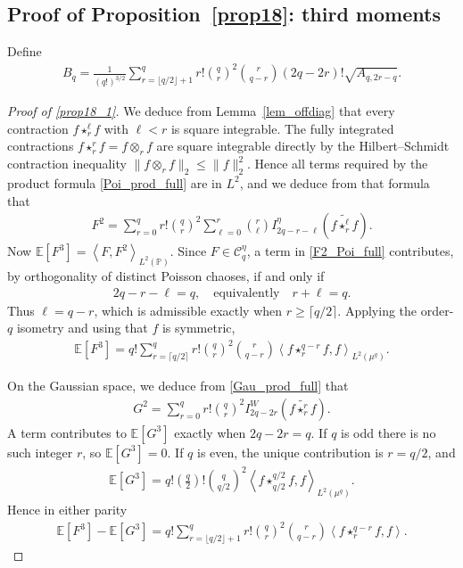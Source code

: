 \documentclass[letterpaper,11pt,reqno]{amsart}
\numberwithin{equation}{section}
\theoremstyle{plain}
\theoremstyle{definition}
\theoremstyle{remark}
\newcommand{\E}{\mathbb{E}}
\newcommand{\PP}{\mathbb{P}}
\newcommand{\cC}{\mathcal{C}}
\newcommand{\noi}{\noindent}
\newcommand{\wt}{\widetilde}
\newcommand{\inner}[2]{\left\langle #1,#2\right\rangle}
\begin{document}
\subsection{Proof of Proposition~\ref{prop18}: third moments}
\label{SEC_53}
Define
\noi
\begin{align}
 B_q
 =\frac1{(q!)^{3/2}}
 \sum_{r=\lfloor q/2\rfloor+1}^{q}
 r!\binom qr^2\binom r{q-r}
 (2q-2r)!
 \sqrt{A_{q,2r-q}}.
 \label{Bq_def}
\end{align}

\begin{proof}[Proof of \eqref{prop18_1}]
We deduce from Lemma~\ref{lem_offdiag} that every contraction
$f\star_r^\ell f$ with $\ell<r$ is square integrable.  The fully
integrated contractions $f\star_r^r f=f\otimes_r f$ are square
integrable directly by the Hilbert--Schmidt contraction inequality
$\|f\otimes_r f\|_2\leq\|f\|_2^2$.  Hence all terms required by
the product formula \eqref{Poi_prod_full} are in $L^2$, and we deduce
from that formula that
\noi
\begin{align}
 F^2
 =\sum_{r=0}^q r!\binom qr^2
 \sum_{\ell=0}^r\binom r\ell
 I_{2q-r-\ell}^\eta
 \left(f \wt{\star_r^\ell} f\right).
 \label{F2_Poi_full}
\end{align}
Now
$\E[F^3]=\inner{F}{F^2}_{L^2(\PP)}$.  Since
$F\in\cC_q^\eta$, a term in \eqref{F2_Poi_full} contributes, by
orthogonality of distinct Poisson chaoses, if and only if
\noi
\begin{align*}
 2q-r-\ell=q,
 \quad\text{equivalently}\quad r+\ell=q.
\end{align*}
Thus $\ell=q-r$, which is admissible exactly when
$r\geq\lceil q/2\rceil$.  Applying the order-$q$ isometry and using
that $f$ is symmetric,
\noi
\begin{align*}
 \E[F^3]
 =q!\sum_{r=\lceil q/2\rceil}^q
 r!\binom qr^2\binom r{q-r}
 \inner{f\star_r^{q-r}f}{f}_{L^2(\mu^q)}.
\end{align*}

On the Gaussian space, we deduce from \eqref{Gau_prod_full} that
\noi
\begin{align}
 G^2
 =\sum_{r=0}^q r!\binom qr^2
 I_{2q-2r}^W
 \left( f \wt{\star_r^r} f\right).
 \label{G2_Gau_full}
\end{align}
A term contributes to $\E[G^3]$ exactly when
$2q-2r=q$.  If $q$ is odd there is no such integer $r$, so
$\E[G^3]=0$.  If $q$ is even, the unique contribution is
$r=q/2$, and
\noi
\begin{align*}
 \E[G^3]
 =q!\left(\frac q2\right)!
 \binom q{q/2}^2
 \inner{f\star_{q/2}^{q/2}f}{f}_{L^2(\mu^q)}.
\end{align*}
Hence in either parity
\noi
\begin{align}
 \E[F^3]-\E[G^3]
 =q!\sum_{r=\lfloor q/2\rfloor+1}^q
 r!\binom qr^2\binom r{q-r}
 \inner{f\star_r^{q-r}f}{f}.
 \label{third_diff_exact}
\end{align}



\end{proof}
\end{document}
